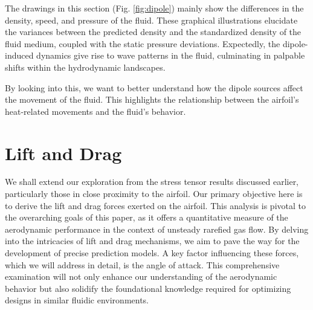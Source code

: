 The drawings in this section (Fig. \ref{fig:dipole}) mainly show the differences in the density, speed, and pressure of the fluid. These graphical illustrations elucidate the variances between the predicted density and the standardized density of the fluid medium, coupled with the static pressure deviations. Expectedly, the dipole-induced dynamics give rise to wave patterns in the fluid, culminating in palpable shifts within the hydrodynamic landscapes.

By looking into this, we want to better understand how the dipole sources affect the movement of the fluid. This highlights the relationship between the airfoil's heat-related movements and the fluid's behavior.

\section{Lift and Drag}
We shall extend our exploration from the stress tensor results discussed earlier, particularly those in close proximity to the airfoil. Our primary objective here is to derive the lift and drag forces exerted on the airfoil. This analysis is pivotal to the overarching goals of this paper, as it offers a quantitative measure of the aerodynamic performance in the context of unsteady rarefied gas flow. By delving into the intricacies of lift and drag mechanisms, we aim to pave the way for the development of precise prediction models. A key factor influencing these forces, which we will address in detail, is the angle of attack. This comprehensive examination will not only enhance our understanding of the aerodynamic behavior but also solidify the foundational knowledge required for optimizing designs in similar fluidic environments.

